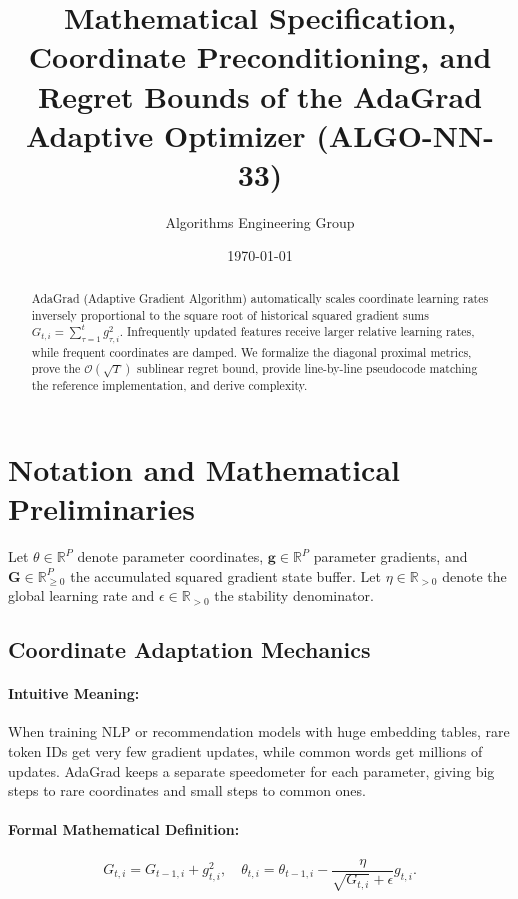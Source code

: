\documentclass[11pt]{article}
\title{\textbf{Mathematical Specification, Coordinate Preconditioning, and Regret Bounds of the AdaGrad Adaptive Optimizer (ALGO-NN-33)}}
\author{Algorithms Engineering Group}
\date{\today}
\begin{document}
\maketitle

\begin{abstract}
AdaGrad (Adaptive Gradient Algorithm) automatically scales coordinate learning rates inversely proportional to the square root of historical squared gradient sums $G_{t, i} = \sum_{\tau=1}^t g_{\tau, i}^2$. Infrequently updated features receive larger relative learning rates, while frequent coordinates are damped. We formalize the diagonal proximal metrics, prove the $\mathcal{O}(\sqrt{T})$ sublinear regret bound, provide line-by-line pseudocode matching the reference implementation, and derive complexity.
\end{abstract}

\section{Notation and Mathematical Preliminaries}
\label{sec:notation}

Let $\theta \in \mathbb{R}^P$ denote parameter coordinates, $\mathbf{g} \in \mathbb{R}^P$ parameter gradients, and $\mathbf{G} \in \mathbb{R}_{\ge 0}^P$ the accumulated squared gradient state buffer. Let $\eta \in \mathbb{R}_{>0}$ denote the global learning rate and $\epsilon \in \mathbb{R}_{>0}$ the stability denominator.

\subsection{Coordinate Adaptation Mechanics}
\paragraph{Intuitive Meaning:} When training NLP or recommendation models with huge embedding tables, rare token IDs get very few gradient updates, while common words get millions of updates. AdaGrad keeps a separate speedometer for each parameter, giving big steps to rare coordinates and small steps to common ones.

\paragraph{Formal Mathematical Definition:}
\begin{equation}
\label{eq:adagrad_update}
G_{t, i} = G_{t-1, i} + g_{t, i}^2, \quad \theta_{t, i} = \theta_{t-1, i} - \frac{\eta}{\sqrt{G_{t, i}} + \epsilon} g_{t, i}.
\end{equation}
\end{document}
